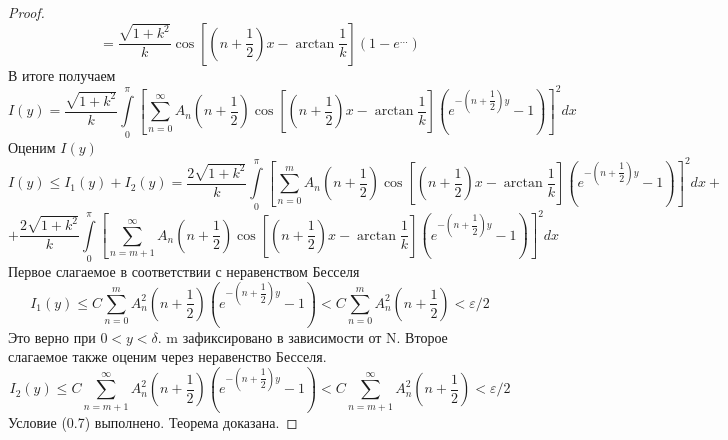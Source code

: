 \documentclass[10pt, a4paper]{extarticle}
\numberwithin{equation}{section}
\numberwithin{lemma}{section}
\numberwithin{definition}{section}
\numberwithin{notabene}{section}
\numberwithin{corollary}{section}
\begin{document}
\begin{proof}
\begin{equation*}
	= \dfrac{\sqrt{1+k^2}}{k} \cos{\left[\left(n +\dfrac12\right)x - \arctan{\dfrac{1}{k}}\right]} \left(1 - e^{\dots} \right)
\end{equation*}
В итоге получаем
	\begin{equation*}
		I(y) = \dfrac{\sqrt{1+k^2}}{k} \int\limits_0^\pi \left[\sum\limits_{n=0}^{\infty} A_n \left(n+\dfrac12\right) \cos{\left[\left(n +\dfrac12\right)x - \arctan{\dfrac{1}{k}}\right]} \left( e^{-\left(	n+\dfrac12\right)y} - 1\right)  \right]^2 dx
	\end{equation*}
Оценим $I(y)$
\begin{equation*}
	I(y) \leq I_1(y) + I_2(y)	= \dfrac{2\sqrt{1+k^2}}{k} \int\limits_0^\pi \left[\sum\limits_{n=0}^{m} A_n \left(n+\dfrac12\right) \cos{\left[\left(n +\dfrac12\right)x - \arctan{\dfrac{1}{k}}\right]} \left( e^{-\left(	n+\dfrac12\right)y} - 1\right)  \right]^2 dx + 
\end{equation*}
\begin{equation*}
		+ \dfrac{2\sqrt{1+k^2}}{k} \int\limits_0^\pi \left[\sum\limits_{n=m+1}^{\infty} A_n \left(n+\dfrac12\right) \cos{\left[\left(n +\dfrac12\right)x - \arctan{\dfrac{1}{k}}\right]} \left( e^{-\left(	n+\dfrac12\right)y} - 1\right)  \right]^2 dx 
\end{equation*}
Первое слагаемое в соответствии с неравенством Бесселя 
	\begin{equation*}
		I_1(y)  \leq C \sum\limits_{n=0}^{m} A_n^2 \left(n+\dfrac12\right) \left(e^{-\left(n+\dfrac12\right)y} - 1\right) < C \sum\limits_{n=0}^{m} A_n^2 \left(n+\dfrac12\right) < \varepsilon / 2
	\end{equation*}
Это верно при $0 < y < \delta$. m зафиксировано в зависимости от N. \newline
Второе слагаемое также оценим через неравенство Бесселя.
	\begin{equation*}
		I_2(y) \leq C \sum\limits_{n=m+1}^{\infty} A_n^2 \left(n+\dfrac12\right) \left(e^{-\left(n+\dfrac12\right)y} - 1\right) < C \sum\limits_{n=m+1}^{\infty} A_n^2 \left(n+\dfrac12\right) < \varepsilon / 2
	\end{equation*}
Условие (0.7) выполнено. Теорема доказана.
\end{proof}
\end{document}

